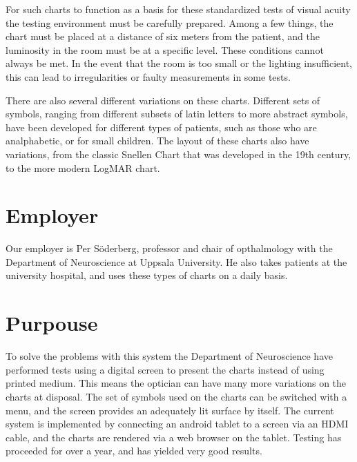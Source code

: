 \documentclass[12pt,a4paper,notitlepage]{report}
\begin{document}
For such charts to function as a basis for these standardized tests of visual acuity the testing environment must be carefully prepared. Among a few things, the chart must be placed at a distance of six meters from the patient, and the luminosity in the room must be at a specific level. These conditions cannot always be met. In the event that the room is too small or the lighting insufficient, this can lead to irregularities or faulty measurements in some tests. 


There are also several different variations on these charts. Different sets of symbols, ranging from different subsets of latin letters to more abstract symbols, have been developed for different types of patients, such as those who are analphabetic, or for small children. The layout of these charts also have variations, from the classic Snellen Chart that was developed in the 19th century, to the more modern LogMAR chart.

\section{Employer}


Our employer is Per Söderberg, professor and chair of opthalmology with the Department of Neuroscience at Uppsala University. He also takes patients at the university hospital, and uses these types of charts on a daily basis. 

\section{Purpouse}
To solve the problems with this system the Department of Neuroscience have performed tests using a digital screen to present the charts instead of using printed medium. This means the optician can have many more variations on the charts at disposal. The set of symbols used on the charts can be switched with a menu, and the screen provides an adequately lit surface by itself. The current system is implemented by connecting an android tablet to a screen via an HDMI cable, and the charts are rendered via a web browser on the tablet. Testing has proceeded for over a year, and has yielded very good results.
\end{document}
